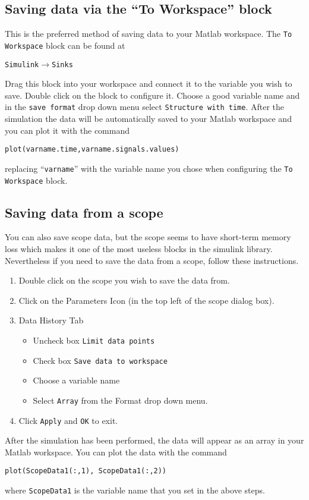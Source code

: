 \subsection{Saving data via the ``To Workspace'' block}

This is the preferred method of saving data to your \textsf{Matlab}
workspace.  The \verb|To Workspace| block can be found at
\begin{center}
    \verb|Simulink|\(\to \)\verb|Sinks|
\end{center}
Drag this block into your workspace and connect it to the variable you wish
to save.  Double click on the block to configure it.  Choose a good variable
name and in the \verb|save format| drop down menu select
\verb|Structure with time|.  After the simulation the data will be
automatically saved to your \textsf{Matlab} workspace and you can plot it
with the command
\begin{center}
    \verb|plot(varname.time,varname.signals.values)|
\end{center}
replacing ``\verb|varname|'' with the variable name you chose when
configuring the \verb|To Workspace| block.

\subsection{Saving data from a scope}

You can also save scope data, but the scope seems to have short-term memory
loss which makes it one of the most useless blocks in the simulink library.
Nevertheless if you need to save the data from a scope, follow these
instructions.
\begin{enumerate}
    \item Double click on the scope you wish to save the data from.
    \item Click on the Parameters Icon (in the top left of the scope dialog box).
    \item Data History Tab
          \begin{itemize}
              \item Uncheck box \verb|Limit data points|
              \item Check box \verb|Save data to workspace|
              \item Choose a variable name
              \item Select \verb|Array| from the Format drop down menu.
          \end{itemize}
    \item Click \verb|Apply| and \verb|OK| to exit.
\end{enumerate}
After the simulation has been performed, the data will appear as an array in
your \textsf{Matlab} workspace.  You can plot the data with the
command \begin{center}
    \verb|plot(ScopeData1(:,1), ScopeData1(:,2))|
\end{center}
where \verb|ScopeData1| is the variable name that you set in the above steps.


